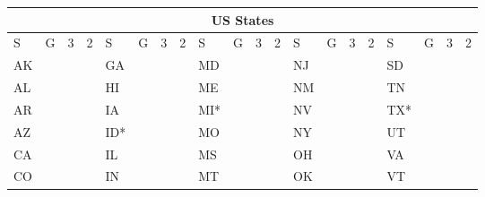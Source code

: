 \documentclass[100pt]{article}
\begin{document}
\fontsize{34}{40}\selectfont
\centering
\begin{adjustbox}{valign=t}
\begin{tabular}{@{}ll|l|l||ll|l|l||ll|l|l||ll|l|l||ll|l|l@{}}
\multicolumn{20}{c}{US States} \\
\toprule
S  & G                  & 3                  & 2               & S   & G                & 3                & 2                & S   & G                  & 3                  & 2                  & S  & G                & 3                & 2               & S   & G                  & 3                  & 2                \\ \midrule
AK & \cellcolor{red}    & \cellcolor{red}    & \cellcolor{red} & GA  & \cellcolor{red}  & \cellcolor{red}  & \cellcolor{red}  & MD  & \cellcolor{yellow} & \cellcolor{yellow} & \cellcolor{red}    & NJ & \cellcolor{red}  & \cellcolor{red}  & \cellcolor{red} & SD  & \cellcolor{blue}   & \cellcolor{blue}   & \cellcolor{blue} \\
AL & \cellcolor{red}    & \cellcolor{red}    & \cellcolor{red} & HI  & \cellcolor{blue} & \cellcolor{red}  & \cellcolor{red}  & ME  & \cellcolor{red}    & \cellcolor{red}    & \cellcolor{red}    & NM & \cellcolor{blue} & \cellcolor{blue} & \cellcolor{red} & TN  & \cellcolor{red}    & \cellcolor{red}    & \cellcolor{red}  \\
AR & \cellcolor{blue}   & \cellcolor{blue}   & \cellcolor{red} & IA  & \cellcolor{blue} & \cellcolor{blue} & \cellcolor{blue} & MI* & \cellcolor{yellow} & \cellcolor{yellow} & \cellcolor{yellow} & NV & \cellcolor{red}  & \cellcolor{red}  & \cellcolor{red} & TX* & \cellcolor{blue}   & \cellcolor{blue}   & \cellcolor{red}  \\
AZ & \cellcolor{red}    & \cellcolor{red}    & \cellcolor{red} & ID* & \cellcolor{blue} & \cellcolor{red}  & \cellcolor{red}  & MO  & \cellcolor{red}    & \cellcolor{red}    & \cellcolor{red}    & NY & \cellcolor{red}  & \cellcolor{red}  & \cellcolor{red} & UT  & \cellcolor{blue}   & \cellcolor{red}    & \cellcolor{red}  \\
CA & \cellcolor{blue}   & \cellcolor{red}    & \cellcolor{red} & IL  & \cellcolor{red}  & \cellcolor{red}  & \cellcolor{red}  & MS  & \cellcolor{red}    & \cellcolor{red}    & \cellcolor{red}    & OH & \cellcolor{red}  & \cellcolor{red}  & \cellcolor{red} & VA  & \cellcolor{yellow} & \cellcolor{yellow} & \cellcolor{red}  \\
CO & \cellcolor{blue}   & \cellcolor{blue}   & \cellcolor{red} & IN  & \cellcolor{red}  & \cellcolor{red}  & \cellcolor{red}  & MT  & \cellcolor{blue}   & \cellcolor{blue}   & \cellcolor{red}    & OK & \cellcolor{blue} & \cellcolor{blue} & \cellcolor{red} & VT  & \cellcolor{red}    & \cellcolor{red}    & \cellcolor{red}  \\

\end{tabular}
\end{adjustbox}
\end{document}
